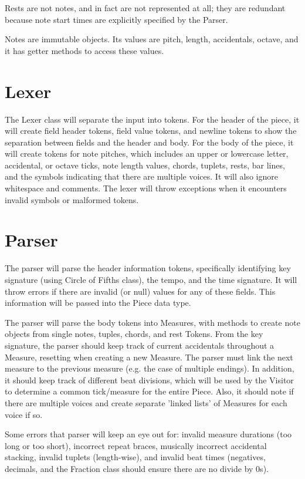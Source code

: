 \documentclass{amsart}
\begin{document}
Rests are not notes, and in fact are not represented at all; they are redundant because note start times are explicitly specified by the Parser.

Notes are immutable objects.  Its values are pitch, length, accidentals, octave, and it has getter methods to access these values.  

\section{ Lexer }
The Lexer class will separate the input into tokens.  For the header of the piece, it will create field header tokens, field value tokens, and newline tokens to show the separation between fields and the header and body.  
For the body of the piece, it will create tokens for note pitches, which includes an upper or lowercase letter, accidental, or octave ticks, note length values, chords, tuplets, rests, bar lines, and the symbols indicating that there are multiple voices.  It will also ignore whitespace and comments.
The lexer will throw exceptions when it encounters invalid symbols or malformed tokens.  

\section{ Parser }
The parser will parse the header information tokens, specifically identifying key signature (using Circle of Fifths class), the tempo, and the time signature.  It will throw errors if there are invalid (or null) values for any of these fields.  This information will be passed into the Piece data type.  

The parser will parse the body tokens into Measures, with methods to create note objects from single notes, tuples, chords, and rest Tokens.  From the key signature, the parser should keep track of current accidentals throughout a Measure, resetting when creating a new Measure.  The parser must link the next measure to the previous measure (e.g. the case of multiple endings).  In addition, it should keep track of different beat divisions, which will be used by the Visitor to determine a common tick/measure for the entire Piece.  Also, it should note if there are multiple voices and create separate 'linked lists' of Measures for each voice if so.  

Some errors that parser will keep an eye out for: invalid measure durations (too long or too short), incorrect repeat braces, musically incorrect accidental stacking, invalid tuplets (length-wise), and invalid beat times (negatives, decimals, and the Fraction class should ensure there are no divide by 0s). 
\end{document}
